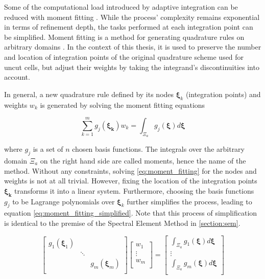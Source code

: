 Some of the computational load introduced by adaptive integration can be reduced
with moment fitting \cite{Joulaian2015}. While the process' complexity remains exponential in terms of refinement depth, the tasks performed at each integration point can be simplified. Moment fitting is a method for generating quadrature rules on arbitrary domains \cite{Muller2013}. In the context of this thesis, it is used to preserve the number and location of integration points of the original quadrature scheme used for uncut cells, but adjust their weights by taking the integrand's discontinuities into account.

In general, a new quadrature rule defined by its nodes $\boldsymbol{\xi}_k$ (integration points) and weights $w_k$ is generated by solving the moment fitting equations

\begin{equation} \label{eq:moment_fitting}
		\sum_{k=1}^m g_j(\boldsymbol{\xi_k}) w_k = \int_{\Xi_a} g_j(\boldsymbol{\xi}) d\boldsymbol{\xi}
\end{equation}

where $g_j$ is a set of $n$ chosen basis functions. The integrals over the arbitrary domain $\Xi_a$ on the right hand side are called moments, hence the name of the method. Without any constraints, solving \ref{eq:moment_fitting} for the nodes and weights is not at all trivial. However, fixing the location of the integration points $\boldsymbol{\xi_k}$ transforms it into a linear system. Furthermore, choosing the basis functions $g_j$ to be Lagrange polynomials over $\boldsymbol{\xi}_k$ further simplifies the process, leading to equation \ref{eq:moment_fitting_simplified}. Note that this process of simplification is identical to the premise of the Spectral Element Method in \ref{section:sem}.

\begin{equation} \label{eq:moment_fitting_simplified}
	\begin{bmatrix}
		g_1(\boldsymbol{\xi}_1) & & \\
		& \ddots & \\
		& & g_m(\boldsymbol{\xi}_m) \\
	\end{bmatrix}
	\begin{bmatrix}
		w_1 \\
		\vdots \\
		w_m \\
	\end{bmatrix}
	=
	\begin{bmatrix}
		\int_{\Xi_a} g_1(\boldsymbol{\xi}) d\boldsymbol{\xi} \\
		\vdots \\
		\int_{\Xi_a} g_m(\boldsymbol{\xi}) d\boldsymbol{\xi} \\
	\end{bmatrix}
\end{equation}

